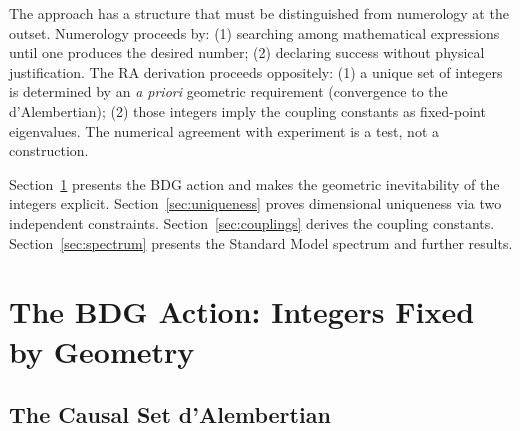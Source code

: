\documentclass[12pt,a4paper]{article}
\begin{document}
The approach has a structure that must be distinguished from numerology at the outset.  Numerology proceeds by: (1) searching among mathematical expressions until one produces the desired number; (2) declaring success without physical justification.  The RA derivation proceeds oppositely: (1) a unique set of integers is determined by an \emph{a priori} geometric requirement (convergence to the d'Alembertian); (2) those integers imply the coupling constants as fixed-point eigenvalues.  The numerical agreement with experiment is a test, not a construction.

Section~\ref{sec:bdg} presents the BDG action and makes the geometric inevitability of the integers explicit.  Section~\ref{sec:uniqueness} proves dimensional uniqueness via two independent constraints.  Section~\ref{sec:couplings} derives the coupling constants.  Section~\ref{sec:spectrum} presents the Standard Model spectrum and further results.

\section{The BDG Action: Integers Fixed by Geometry}\label{sec:bdg}

\subsection{The Causal Set d'Alembertian}
\end{document}
